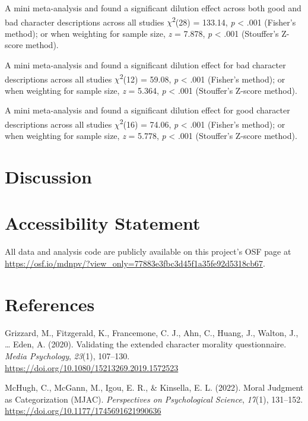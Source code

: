 \documentclass[
  english,
  man,floatsintext]{apa7}
\begin{document}
A mini meta-analysis and found a significant dilution effect across both good and bad character descriptions across all studies \(\chi\)\textsuperscript{2}(28) = 133.14, \emph{p} \textless{} .001 (Fisher's method); or when weighting for sample size, \emph{z} = 7.878, \emph{p} \textless{} .001 (Stouffer's Z-score method).

A mini meta-analysis and found a significant dilution effect for bad character descriptions across all studies \(\chi\)\textsuperscript{2}(12) = 59.08, \emph{p} \textless{} .001 (Fisher's method); or when weighting for sample size, \emph{z} = 5.364, \emph{p} \textless{} .001 (Stouffer's Z-score method).

A mini meta-analysis and found a significant dilution effect for good character descriptions across all studies \(\chi\)\textsuperscript{2}(16) = 74.06, \emph{p} \textless{} .001 (Fisher's method); or when weighting for sample size, \emph{z} = 5.778, \emph{p} \textless{} .001 (Stouffer's Z-score method).

\hypertarget{discussion}{%
\section{Discussion}\label{discussion}}

\hypertarget{accessibility-statement}{%
\section{Accessibility Statement}\label{accessibility-statement}}

All data and analysis code are publicly available on this project's OSF page at \color{blue}\url{https://osf.io/mdnpv/?view_only=77883e3fbc3d45f1a35fe92d5318cb67}\color{black}.

\newpage

\hypertarget{references}{%
\section*{References}\label{references}}

\hypertarget{refs}{}
\leavevmode\hypertarget{ref-grizzard_validating_2020}{}%
Grizzard, M., Fitzgerald, K., Francemone, C. J., Ahn, C., Huang, J., Walton, J., \ldots{} Eden, A. (2020). Validating the extended character morality questionnaire. \emph{Media Psychology}, \emph{23}(1), 107--130. \url{https://doi.org/10.1080/15213269.2019.1572523}

\leavevmode\hypertarget{ref-mchugh_moral_2022}{}%
McHugh, C., McGann, M., Igou, E. R., \& Kinsella, E. L. (2022). Moral Judgment as Categorization (MJAC). \emph{Perspectives on Psychological Science}, \emph{17}(1), 131--152. \url{https://doi.org/10.1177/1745691621990636}
\end{document}
